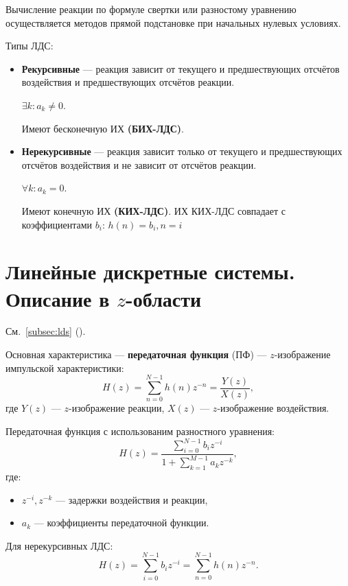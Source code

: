 \documentclass[a4paper, 14pt]{extarticle}
\begin{document}
Вычисление реакции по формуле свертки или разностому уравнению осуществляется методов прямой подстановке при начальных нулевых условиях.

Типы ЛДС:
\begin{itemize}
    \item \textbf{Рекурсивные} --- реакция зависит от текущего и предшествующих отсчётов воздействия и предшествующих отсчётов реакции.

        $ \exists k: a_k \ne 0$.

        Имеют бесконечную ИХ \textbf{(БИХ-ЛДС)}.
    \item \textbf{Нерекурсивные} --- реакция зависит только от текущего и предшествующих отсчётов воздействия и не зависит от отсчётов реакции.

        $\forall k: a_k = 0$.

        Имеют конечную ИХ \textbf{(КИХ-ЛДС)}. ИХ КИХ-ЛДС совпадает с коэффициентами $b_i$: $h(n) = b_i, n=i$
\end{itemize}

\section{Линейные дискретные системы. Описание в $z$-области}
См.~\ref{subsec:lds} ().

Основная характеристика --- \textbf{передаточная функция} (ПФ) --- $z$-изображение импульской характеристики:
\begin{equation}\label{eq:tf}
    H(z) = \sum^{N-1}_{n=0} h(n) z^{-n} = \frac{Y(z)}{X(z)},
\end{equation}
где $Y(z)$ --- $z$-изображение реакции, $X(z)$ --- $z$-изображение воздействия.

Передаточная функция с использованим разностного уравнения:
\begin{equation}
    H(z) = \frac{ \sum^{N-1}_{i=0} b_i z^{-i} }{1 + \sum^{M-1}_{k=1} a_k z^{-k}},
\end{equation}
где:
\begin{itemize}
    \item $z^{-i}, z^{-k}$ --- задержки воздействия и реакции,
    \item $a_k$ --- коэффициенты передаточной функции.
\end{itemize}

Для нерекурсивных ЛДС:
\begin{equation}
    H(z) = \sum^{N-1}_{i=0} b_i z^{-i} = \sum^{N-1}_{n=0} h(n) z^{-n}.
\end{equation}
\end{document}
